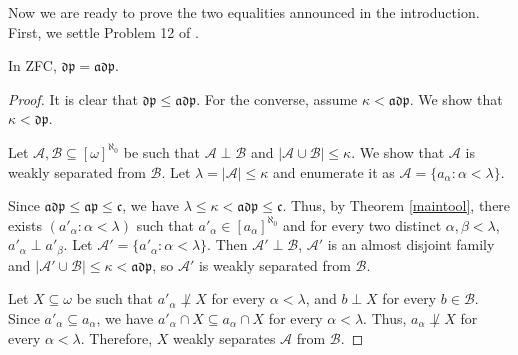 Now we are ready to prove the two equalities announced in the introduction.
First, we settle Problem 12 of \cite{banakh2023q}.

\begin{thm}\label{thm:adp-equals-dp}
     In ZFC,
    $\mathfrak{dp}=\mathfrak{adp}$.
\end{thm}
\begin{proof}
    It is clear that $\mathfrak{dp}\leq\mathfrak{adp}$. For the converse, assume $\kappa<\mathfrak{adp}$.
    We show that $\kappa<\mathfrak{dp}$.

    Let $\mathcal A, \mathcal B\subseteq[\omega]^{\aleph_0}$ be such that $\mathcal A\perp\mathcal B$ and $|\mathcal A\cup\mathcal B|\leq\kappa$.
    We show that $\mathcal A$ is weakly separated from $\mathcal B$.
    Let $\lambda=|\mathcal A|\leq \kappa$ and enumerate it as $\mathcal A=\{a_\alpha: \alpha<\lambda\}$.

    Since $\mathfrak{adp}\leq\mathfrak{ap}\leq\mathfrak c$, we have
    $\lambda\leq\kappa<\mathfrak{adp}\leq\mathfrak c$.
    Thus, by Theorem \ref{maintool}, there exists $(a'_\alpha: \alpha<\lambda)$ such that $a'_\alpha\in[a_\alpha]^{\aleph_0}$ and for every two distinct
    $\alpha, \beta<\lambda$, $a'_\alpha\perp a'_\beta$. Let $\mathcal A'=\{a'_\alpha: \alpha<\lambda\}$. 
    Then $\mathcal A'\perp \mathcal B$, $\mathcal A'$ is an almost disjoint family and
    $|\mathcal A'\cup\mathcal B|\leq \kappa<\mathfrak{adp}$, so $\mathcal A'$ is weakly separated from $\mathcal B$.

    Let $X\subseteq \omega$ be such that $a'_\alpha\not\perp X$ for every $\alpha<\lambda$, and $b\perp X$ for every $b\in\mathcal B$.
    Since $a'_\alpha\subseteq a_\alpha$, we have $a'_\alpha\cap X\subseteq a_\alpha\cap X$ for every $\alpha<\lambda$.
    Thus, $a_\alpha\not\perp X$ for every $\alpha<\lambda$.
    Therefore, $X$ weakly separates $\mathcal A$ from $\mathcal B$.
\end{proof}

